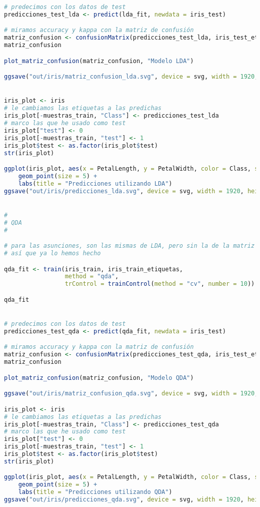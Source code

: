 \begin{lstlisting}[language=R]
# predecimos con los datos de test
predicciones_test_lda <- predict(lda_fit, newdata = iris_test)

# miramos accuracy y kappa con la matriz de confusión
matriz_confusion <- confusionMatrix(predicciones_test_lda, iris_test_etiquetas)
matriz_confusion

plot_matriz_confusion(matriz_confusion, "Modelo LDA")

ggsave("out/iris/matriz_confusion_lda.svg", device = svg, width = 1920, height = 1080, units = "px", dpi = 150)


iris_plot <- iris
# le cambiamos las etiquetas a las predichas
iris_plot[-muestras_train, "Class"] <- predicciones_test_lda
# marco las que he usado como test
iris_plot["test"] <- 0
iris_plot[-muestras_train, "test"] <- 1
iris_plot$test <- as.factor(iris_plot$test)
str(iris_plot)

ggplot(iris_plot, aes(x = PetalLength, y = PetalWidth, color = Class, shape = test)) +
	geom_point(size = 5) +
	labs(title = "Predicciones utilizando LDA")
ggsave("out/iris/predicciones_lda.svg", device = svg, width = 1920, height = 1080, units = "px", dpi = 150)


#
# QDA
#

# para las asunciones, son las mismas de LDA, pero sin la de la matriz de covarianza
# así que ya lo hemos hecho

qda_fit <- train(iris_train, iris_train_etiquetas,
				 method = "qda",
				 trControl = trainControl(method = "cv", number = 10))

qda_fit


# predecimos con los datos de test
predicciones_test_qda <- predict(qda_fit, newdata = iris_test)

# miramos accuracy y kappa con la matriz de confusión
matriz_confusion <- confusionMatrix(predicciones_test_qda, iris_test_etiquetas)
matriz_confusion

plot_matriz_confusion(matriz_confusion, "Modelo QDA")

ggsave("out/iris/matriz_confusion_qda.svg", device = svg, width = 1920, height = 1080, units = "px", dpi = 150)

iris_plot <- iris
# le cambiamos las etiquetas a las predichas
iris_plot[-muestras_train, "Class"] <- predicciones_test_qda
# marco las que he usado como test
iris_plot["test"] <- 0
iris_plot[-muestras_train, "test"] <- 1
iris_plot$test <- as.factor(iris_plot$test)
str(iris_plot)

ggplot(iris_plot, aes(x = PetalLength, y = PetalWidth, color = Class, shape = test)) +
	geom_point(size = 5) +
	labs(title = "Predicciones utilizando QDA")
ggsave("out/iris/predicciones_qda.svg", device = svg, width = 1920, height = 1080, units = "px", dpi = 150)





\end{lstlisting}
